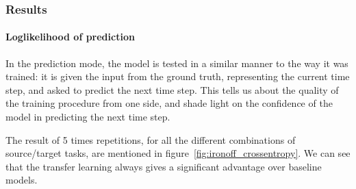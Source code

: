     \subsubsection{Results}

      \paragraph{Loglikelihood of prediction} In the prediction mode, the model is tested in a similar manner to the way it was trained: it is given the input from the ground truth, representing the current time step, and asked to predict the next time step. This tells us about the quality of the training procedure from one side, and shade light on the confidence of the model in predicting the next time step.

      The result of 5 times repetitions, for all the different combinations of source/target tasks, are mentioned in figure~\ref{fig:ironoff_crossentropy}. We can see that the transfer learning always gives a significant advantage over baseline models.
